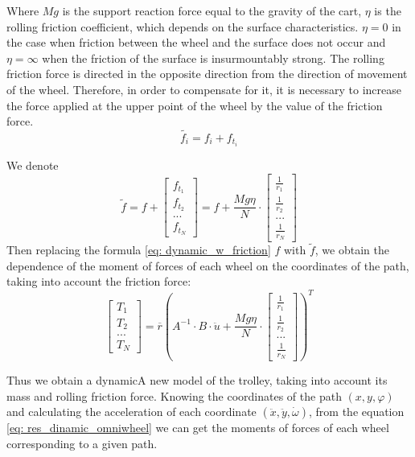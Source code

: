 \documentclass[oneside,final,14pt]{extreport}
\begin{document}
Where $ Mg $ is the support reaction force equal to the gravity of the cart, $ \eta $ is the rolling friction coefficient, which depends on the surface characteristics. $ \eta = 0 $ in the case when friction between the wheel and the surface does not occur and $ \eta = \infty $ when the friction of the surface is insurmountably strong.
The rolling friction force is directed in the opposite direction from the direction of movement of the wheel. Therefore, in order to compensate for it, it is necessary to increase the force applied at the upper point of the wheel by the value of the friction force.
\begin{equation}
\tilde{f_{i}}
=
f_{i}
+
f_{t_{i}}
\end{equation}

We denote
\begin{equation}
\tilde{f}
=
f
+
\begin{bmatrix}
f_{t_{1}} \\
f_{t_{2}} \\
... \\
f_{t_{N}}
\end{bmatrix}
=
f
+
\frac{Mg \eta}{N}
\cdot
\begin{bmatrix}
\frac{1}{r_{1}} \\
\frac{1}{r_{2}} \\
... \\
\frac{1}{r_{N}}
\end{bmatrix}
\end{equation}
Then replacing the formula \ref{eq: dynamic_w_friction} $ f $ with $ \tilde{f} $, we obtain the dependence of the moment of forces of each wheel on the coordinates of the path, taking into account the friction force:
\begin{equation}
\label{eq: res_dinamic_omniwheel}
\begin{bmatrix}
T_{1} \\
T_{2} \\
... \\
T_{N}
\end{bmatrix}
=
\overline{r}
(
A ^{- 1}
\cdot
B
\cdot
\ddot{u}
+
\frac{Mg \eta}{N}
\cdot
\begin{bmatrix}
\frac{1}{r_{1}} \\
\frac{1}{r_{2}} \\
... \\
\frac{1}{r_{N}}
\end{bmatrix}
) ^{T}
\end{equation}

Thus we obtain a dynamicA new model of the trolley, taking into account its mass and rolling friction force. Knowing the coordinates of the path $ (x, y, \varphi) $ and calculating the acceleration of each coordinate $ (\ddot{x}, \ddot{y}, \dot{\omega}) $, from the equation \ref{eq: res_dinamic_omniwheel} we can get the moments of forces of each wheel corresponding to a given path.
\end{document}
